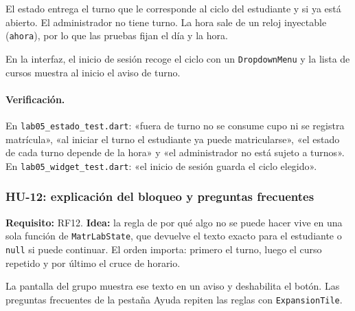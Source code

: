 
El estado entrega el turno que le corresponde al ciclo del estudiante y si ya está abierto. El administrador no tiene turno. La hora sale de un reloj inyectable (\texttt{ahora}), por lo que las pruebas fijan el día y la hora.


En la interfaz, el inicio de sesión recoge el ciclo con un \texttt{DropdownMenu} y la lista de cursos muestra al inicio el aviso de turno.



\paragraph{Verificación.} En \texttt{lab05\_estado\_test.dart}: «fuera de turno no se consume cupo ni se registra matrícula», «al iniciar el turno el estudiante ya puede matricularse», «el estado de cada turno depende de la hora» y «el administrador no está sujeto a turnos». En \texttt{lab05\_widget\_test.dart}: «el inicio de sesión guarda el ciclo elegido».

\subsubsection{HU-12: explicación del bloqueo y preguntas frecuentes}
\textbf{Requisito:} RF12. \textbf{Idea:} la regla de por qué algo no se puede hacer vive en una sola función de \texttt{MatrLabState}, que devuelve el texto exacto para el estudiante o \texttt{null} si puede continuar. El orden importa: primero el turno, luego el curso repetido y por último el cruce de horario.


La pantalla del grupo muestra ese texto en un aviso y deshabilita el botón. Las preguntas frecuentes de la pestaña Ayuda repiten las reglas con \texttt{ExpansionTile}.

